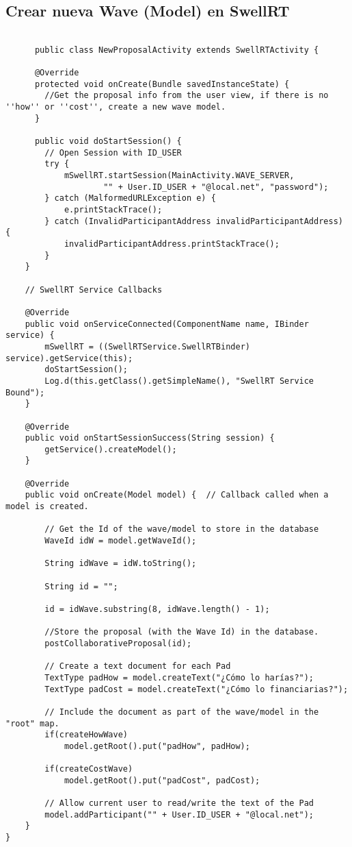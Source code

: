 \subsection{Crear nueva Wave (Model) en SwellRT} \label{ssec:waveCreateModel}

	  \begin{lstlisting}[frame=single]
	  
	  public class NewProposalActivity extends SwellRTActivity {
	  
	  @Override
	  protected void onCreate(Bundle savedInstanceState) {
	  	//Get the proposal info from the user view, if there is no ''how'' or ''cost'', create a new wave model.
	  }
	  
	  public void doStartSession() {
        // Open Session with ID_USER
        try {
            mSwellRT.startSession(MainActivity.WAVE_SERVER,
                    "" + User.ID_USER + "@local.net", "password");
        } catch (MalformedURLException e) {
            e.printStackTrace();
        } catch (InvalidParticipantAddress invalidParticipantAddress) {
            invalidParticipantAddress.printStackTrace();
        }
    }

    // SwellRT Service Callbacks

    @Override
    public void onServiceConnected(ComponentName name, IBinder service) {
        mSwellRT = ((SwellRTService.SwellRTBinder) service).getService(this);
        doStartSession();
        Log.d(this.getClass().getSimpleName(), "SwellRT Service Bound");
    }
    
    @Override
    public void onStartSessionSuccess(String session) {		
		getService().createModel();
    }
   
    @Override
    public void onCreate(Model model) {  // Callback called when a model is created.

        // Get the Id of the wave/model to store in the database
        WaveId idW = model.getWaveId();

        String idWave = idW.toString();

        String id = "";

        id = idWave.substring(8, idWave.length() - 1);

        //Store the proposal (with the Wave Id) in the database.
        postCollaborativeProposal(id);

        // Create a text document for each Pad
        TextType padHow = model.createText("¿Cómo lo harías?");
        TextType padCost = model.createText("¿Cómo lo financiarias?");

        // Include the document as part of the wave/model in the "root" map.
        if(createHowWave)
            model.getRoot().put("padHow", padHow);

        if(createCostWave)
            model.getRoot().put("padCost", padCost);

        // Allow current user to read/write the text of the Pad
        model.addParticipant("" + User.ID_USER + "@local.net");
    }  	
}	  
	  \end{lstlisting}
	  
